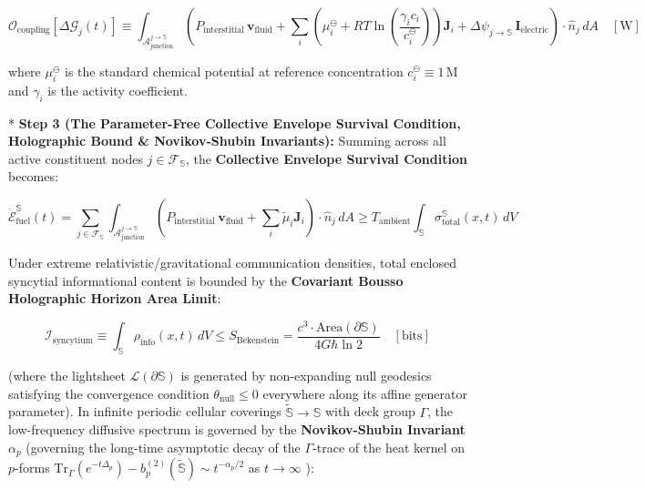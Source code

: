 \documentclass[11pt,a4paper]{article}
\theoremstyle{definition}
\theoremstyle{remark}
\begin{document}
\begin{equation}
\boxed{\mathcal{O}_{\text{coupling}}[ \Delta \mathcal{G}_j(t) ] \equiv \int_{\mathcal{A}_{\text{junction}}^{j \to \mathbb{S}}} \left( P_{\text{interstitial}} \, \mathbf{v}_{\text{fluid}} + \sum_i \left( \mu_i^\ominus + R T \ln \left( \frac{\gamma_i c_i}{c_i^\ominus} \right) \right) \mathbf{J}_i + \Delta \psi_{j \to \mathbb{S}} \, \mathbf{I}_{\text{electric}} \right) \cdot \hat{n}_j \, dA \quad [\mathrm{W}]}
\end{equation}


where $\mu_i^\ominus$ is the standard chemical potential at reference concentration $c_i^\ominus \equiv 1 \, \mathrm{M}$ and $\gamma_i$ is the activity coefficient.

* \textbf{Step 3 (The Parameter-Free Collective Envelope Survival Condition, Holographic Bound \& Novikov-Shubin Invariants):}
Summing across all active constituent nodes $j \in \mathcal{F}_{\mathbb{S}}$, the \textbf{Collective Envelope Survival Condition} becomes:


\begin{equation}
\boxed{\dot{\mathcal{E}}_{\text{fuel}}^{\mathbb{S}}(t) = \sum_{j \in \mathcal{F}_{\mathbb{S}}} \int_{\mathcal{A}_{\text{junction}}^{j \to \mathbb{S}}} \left( P_{\text{interstitial}} \, \mathbf{v}_{\text{fluid}} + \sum_i \tilde{\mu}_i \mathbf{J}_i \right) \cdot \hat{n}_j \, dA \ge T_{\text{ambient}} \int_{\mathbb{S}} \sigma_{\text{total}}^{\mathbb{S}}(x, t) \, dV}
\end{equation}


Under extreme relativistic/gravitational communication densities, total enclosed syncytial informational content is bounded by the \textbf{Covariant Bousso Holographic Horizon Area Limit}:


\begin{equation}
\boxed{\mathcal{I}_{\text{syncytium}} \equiv \int_{\mathbb{S}} \rho_{\text{info}}(x, t) \, dV \le S_{\text{Bekenstein}} = \frac{c^3 \cdot \mathrm{Area}(\partial \mathbb{S})}{4 G \hbar \ln 2} \quad [\text{bits}]}
\end{equation}


(where the lightsheet $\mathcal{L}(\partial\mathbb{S})$ is generated by non-expanding null geodesics satisfying the convergence condition $\theta_{\text{null}} \le 0$ everywhere along its affine generator parameter).
In infinite periodic cellular coverings $\widetilde{\mathbb{S}} \to \mathbb{S}$ with deck group $\Gamma$, the low-frequency diffusive spectrum is governed by the \textbf{Novikov-Shubin Invariant} $\alpha_p$ (governing the long-time asymptotic decay of the $\Gamma$-trace of the heat kernel on $p$-forms $\mathrm{Tr}_{\Gamma}\left( e^{-t\Delta_p} \right) - b_p^{(2)}(\widetilde{\mathbb{S}}) \sim t^{-\alpha_p / 2}$ as $t \to \infty$ ):
\end{document}
